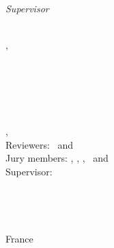 \begin{titlepage}
    \begin{minipage}[t]{.21\textwidth}
        \raggedleft
        {\small \textit{Supervisor}}
    \end{minipage}
    \hspace*{15pt}
    \begin{minipage}[t]{.7\textwidth}
        {\large \thesisFirstSupervisor}\\
        {\small \thesisUniversityTitle},
        {\small \thesisUniversity}
    \end{minipage} \\[15mm]

    \thesisDate \\

\end{titlepage}


\hfill
\vfill
{\small
\textbf{\thesisName} \\
\textit{\thesisTitle} \\
\thesisSubject, \thesisDate \\
Reviewers: \thesisFirstReviewer\ and \thesisSecondReviewer \\
Jury members: \thesisPresident, \thesisFirstReviewer, \thesisSecondReviewer, \thesisExaminator\ and \thesisFirstSupervisor\\
Supervisor: \thesisFirstSupervisor\\[1.5em]
\textbf{\thesisUniversity} \\
\thesisUniversityDepartment \\
\thesisUniversityStreetAddress \\
\thesisUniversityPostalCode\ \thesisUniversityCity\\
France
}
